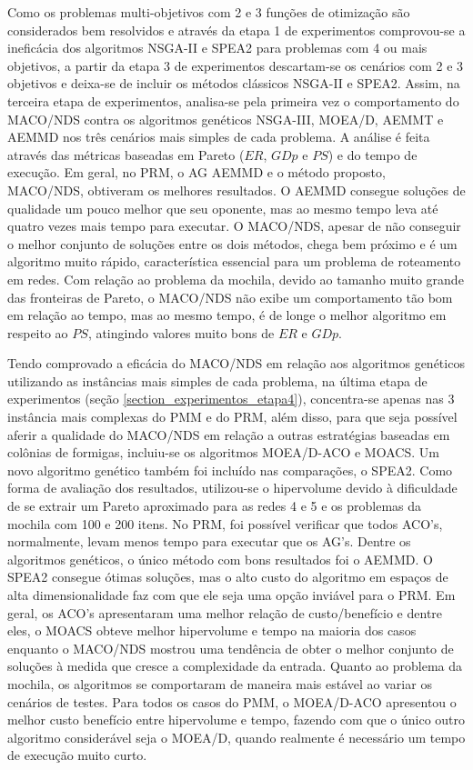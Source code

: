 Como os problemas multi-objetivos com 2 e 3 funções de otimização são considerados bem resolvidos e através da etapa 1 de experimentos comprovou-se a ineficácia dos algoritmos NSGA-II e SPEA2 para problemas com 4 ou mais objetivos, a partir da etapa 3 de experimentos descartam-se os cenários com 2 e 3 objetivos e deixa-se de incluir os métodos clássicos NSGA-II e SPEA2. Assim, na terceira etapa de experimentos, analisa-se pela primeira vez o comportamento do MACO/NDS contra os algoritmos genéticos NSGA-III, MOEA/D, AEMMT e AEMMD nos três cenários mais simples de cada problema. A análise é feita através das métricas baseadas em Pareto ($ER$, $GDp$ e $PS$) e do tempo de execução. Em geral, no PRM, o AG AEMMD e o método proposto, MACO/NDS, obtiveram os melhores resultados. O AEMMD consegue soluções de qualidade um pouco melhor que seu oponente, mas ao mesmo tempo leva até quatro vezes mais tempo para executar. O MACO/NDS, apesar de não conseguir o melhor conjunto de soluções entre os dois métodos, chega bem próximo e é um algoritmo muito rápido, característica essencial para um problema de roteamento em redes. Com relação ao problema da mochila, devido ao tamanho muito grande das fronteiras de Pareto, o MACO/NDS não exibe um comportamento tão bom em relação ao tempo, mas ao mesmo tempo, é de longe o melhor algoritmo em respeito ao $PS$, atingindo valores muito bons de $ER$ e $GDp$.

Tendo comprovado a eficácia do MACO/NDS em relação aos algoritmos genéticos utilizando as instâncias mais simples de cada problema, na última etapa de experimentos (seção \ref{section_experimentos_etapa4}), concentra-se apenas nas 3 instância mais complexas do PMM e do PRM, além disso, para que seja possível aferir a qualidade do MACO/NDS em relação a outras estratégias baseadas em colônias de formigas, incluiu-se os algoritmos MOEA/D-ACO e MOACS. Um novo algoritmo genético também foi incluído nas comparações, o SPEA2. Como forma de avaliação dos resultados, utilizou-se o hipervolume devido à dificuldade de se extrair um Pareto aproximado para as redes 4 e 5 e os problemas da mochila com 100 e 200 itens. No PRM, foi possível verificar que todos ACO's, normalmente, levam menos tempo para executar que os AG's. Dentre os algoritmos genéticos, o único método com bons resultados foi o AEMMD. O SPEA2 consegue ótimas soluções, mas o alto custo do algoritmo em espaços de alta dimensionalidade faz com que ele seja uma opção inviável para o PRM. Em geral, os ACO's apresentaram uma melhor relação de custo/benefício e dentre eles, o MOACS obteve melhor hipervolume e tempo na maioria dos casos enquanto o MACO/NDS mostrou uma tendência de obter o melhor conjunto de soluções à medida que cresce a complexidade da entrada. Quanto ao problema da mochila, os algoritmos se comportaram de maneira mais estável ao variar os cenários de testes. Para todos os casos do PMM, o MOEA/D-ACO apresentou o melhor custo benefício entre hipervolume e tempo, fazendo com que o único outro algoritmo considerável seja o MOEA/D, quando realmente é necessário um tempo de execução muito curto.

